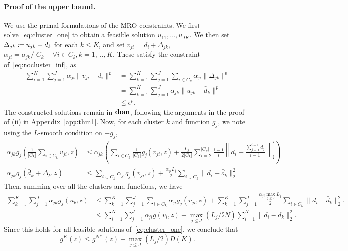 {\paragraph{Proof of the upper bound.}
We use the primal formulations of the \gls{MRO} constraints. 
We first solve~\eqref{eq:cluster_one} to obtain a feasible solution $u_{11}, \dots, u_{JK}$. We then set $\Delta_{jk} \coloneqq u_{jk} - \bar{d}_k$ for each $k \leq K$, and set $v_{ji} = d_i + \Delta_{jk}$, $\alpha_{ji} = \alpha_{jk}/|C_k| \quad \forall i \in C_k, k = 1,\dots,K$.
These satisfy the constraint of~\eqref{eq:nocluster_inf}, as
\begin{align*}
	\sum_{i=1}^N \sum_{j=1}^J  \alpha_{ji} \| v_{ji} - d_i \|^p &= \sum_{k=1}^K \sum_{j=1}^J \sum_{i \in C_k}  \alpha_{ji} \|\Delta_{jk}\|^p\\
	&= \sum_{k=1}^K \sum_{j=1}^J \alpha_{jk} \|u_{jk} - \bar{d}_k\|^p\\
	&\leq \epsilon^p.
\end{align*}
The constructed solutions remain in $\mathop{\bf dom}$, following the arguments in the proof of (ii) in Appendix~\ref{app:thm1}. 
Now, for each cluster $k$ and function $g_j$, we note using the $L$-smooth condition on $-g_j$,
\begin{align*}
	\alpha_{jk} g_j\left(\frac{1}{|C_k|}\sum_{i \in C_k} v_{ji}, z\right) &\leq  \alpha_{jk} \left (\sum_{i \in C_k} \frac{1}{|C_k|} g_j(v_{ji},z) + \frac{L_j}{2|C_k|} \sum_{i=2} ^{|C_k|} \frac{i-1}{i} \left \|d_i - \frac{\sum_{j=1}^{i-1}d_j}{i-1} \right \|^2_2\right )\\
	\alpha_{jk} g_j(\bar{d}_k + \Delta_k,z) &\leq  \sum_{i \in C_k} \alpha_{ji} g_j(v_{ji},z)  + \frac{\alpha_{ji} L_j}{2} \sum_{i \in C_k} \|d_i - \bar{d}_k\|^2_2
\end{align*}
Then, summing over all the clusters and functions, we have 
\begin{align*}
\sum_{k=1}^K \sum_{j=1}^J \alpha_{jk}  g_j(u_k,z) &\leq \sum_{k=1}^K \sum_{j=1}^J \sum_{i \in C_k} \alpha_{ji} g_j(v_{ji},z)  + \sum_{k=1}^K \sum_{j=1}^J \frac{\alpha_{ji}  \max_{j\leq J} L_j}{2} \sum_{i \in C_k} \|d_i - \bar{d}_k\|^2_2.\\
&\leq \sum_{i=1}^N \sum_{j=1}^J \alpha_{ji} g(v_i,z) + \max_{j\leq J} (L_j/2N)\sum_{i=1}^N \|d_i - \bar{d}_k\|^2_2 .
\end{align*}
Since this holds for all feasible solutions of~\eqref{eq:cluster_one}, we conclude that 
$$ \bar{g}^K(z) \leq \bar{g}^{N*}(z) +  \max_{j\leq J} (L_j/2) D(K).$$
}

